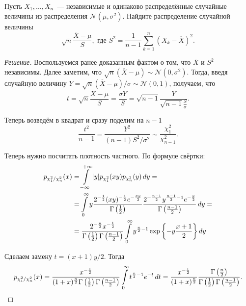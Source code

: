 \begin{problem}
    Пусть \(X_{1}, \dots, X_{n}\)~--- независимые и одинаково распределённые случайные 
    величины из распределения \(\mathcal{N}(\mu, \sigma^{2})\). Найдите распределение 
    случайной величины
    \[
        \sqrt{n}\frac{\overline{X} - \mu}{S}, \text{ где } S^{2} = \frac{1}{n - 1}\sum_{k 
        = 1}^{n}(X_{k} - \overline{X})^{2}.
    \]
\end{problem}
\begin{proof}[Решение]
    Воспользуемся ранее доказанным фактом о том, что \(\overline{X}\) и \(S^{2}\) 
    независимы. Далее заметим, что \(\sqrt{n}(\overline{X} - \mu) \sim \mathcal{N}(0, 
    \sigma^{2})\). Тогда, введя случайную величину \(Y = \sqrt{n}(\overline{X} - 
    \mu)/\sigma \sim \mathcal{N}(0, 1)\), получаем, что
    \[
        t = \sqrt{n}\frac{\overline{X} - \mu}{S} = \frac{\sigma Y}{S} = \sqrt{n - 1} 
        \frac{Y}{\sqrt{n - 1}\frac{S}{\sigma}}.
    \]
    
    Теперь возведём в квадрат и сразу поделим на \(n - 1\)
    \[
        \frac{t^{2}}{n - 1} = \frac{Y^{2}}{(n - 1)S^{2}/\sigma^{2}} \sim 
        \frac{\chi^{2}_{1}}{\chi^{2}_{n - 1}}.
    \]
    
    Теперь нужно посчитать плотность частного. По формуле свёртки:
    \begin{align*}
        p_{\chi^{2}_{1}/\chi^{2}_{n}}(x) &= \int\limits_{-\infty}^{+\infty} 
        |y|p_{\chi^{2}_{1}}(xy)p_{\chi^{2}_{n}}(y)\mathop{}\!d y = \\
        &= \int\limits_{0}^{\infty} y\frac{2^{-\frac{1}{2}}(xy)^{-\frac{1}{2}} 
        e^{-\frac{xy}{2}}}{\Gamma\left(\frac{1}{2}\right)}\frac{2^{-\frac{n - 1}{2}} 
        y^{\frac{n - 1}{2} - 1} e^{-\frac{y}{2}}}{\Gamma\left(\frac{n - 
        1}{2}\right)}\mathop{}\!d y = \\
        &= \frac{2^{-\frac{n}{2}}x^{-\frac{1}{2}}}{\Gamma\left(\frac{1}{2}\right) 
        \Gamma\left(\frac{n - 1}{2}\right)} \int\limits_{0}^{\infty} y^{\frac{n}{2} - 
        1}\exp\left\{-y\frac{x + 1}{2}\right\}\mathop{}\!d y
    \end{align*}
    
    Сделаем замену \(t = (x + 1)y/2\). Тогда
    \[
        p_{\chi^{2}_{1}/\chi^{2}_{n}}(x) = \frac{x^{-\frac{1}{2}}}{(1 + 
        x)^{\frac{n}{2}}\Gamma\left(\frac{1}{2}\right) \Gamma\left(\frac{n - 
        1}{2}\right)} \int\limits_{0}^{\infty} t^{\frac{n}{2} - 1}e^{-t}\mathop{}\!d t = 
        \frac{x^{-\frac{1}{2}}}{(1 + x)^{\frac{n}{2}}} 
        \frac{\Gamma\left(\frac{n}{2}\right)} {\Gamma\left(\frac{1}{2}\right) 
        \Gamma\left(\frac{n - 1}{2}\right)}.
    \]
    

\end{proof}
